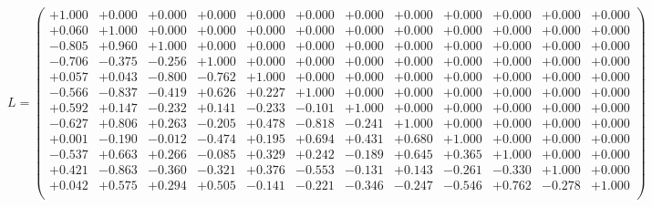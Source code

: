 \documentclass[9pt]{article}
\theoremstyle{plain}
\theoremstyle{definition}
\theoremstyle{remark}
\numberwithin{equation}{section}
\begin{document}
$L = \left(
\begin{array}{
cccccccccccc}
+1.000 & +0.000 & +0.000 & +0.000 & +0.000 & +0.000 & +0.000 & +0.000 & +0.000 & +0.000 & +0.000 & +0.000 \\
+0.060 & +1.000 & +0.000 & +0.000 & +0.000 & +0.000 & +0.000 & +0.000 & +0.000 & +0.000 & +0.000 & +0.000 \\
-0.805 & +0.960 & +1.000 & +0.000 & +0.000 & +0.000 & +0.000 & +0.000 & +0.000 & +0.000 & +0.000 & +0.000 \\
-0.706 & -0.375 & -0.256 & +1.000 & +0.000 & +0.000 & +0.000 & +0.000 & +0.000 & +0.000 & +0.000 & +0.000 \\
+0.057 & +0.043 & -0.800 & -0.762 & +1.000 & +0.000 & +0.000 & +0.000 & +0.000 & +0.000 & +0.000 & +0.000 \\
-0.566 & -0.837 & -0.419 & +0.626 & +0.227 & +1.000 & +0.000 & +0.000 & +0.000 & +0.000 & +0.000 & +0.000 \\
+0.592 & +0.147 & -0.232 & +0.141 & -0.233 & -0.101 & +1.000 & +0.000 & +0.000 & +0.000 & +0.000 & +0.000 \\
-0.627 & +0.806 & +0.263 & -0.205 & +0.478 & -0.818 & -0.241 & +1.000 & +0.000 & +0.000 & +0.000 & +0.000 \\
+0.001 & -0.190 & -0.012 & -0.474 & +0.195 & +0.694 & +0.431 & +0.680 & +1.000 & +0.000 & +0.000 & +0.000 \\
-0.537 & +0.663 & +0.266 & -0.085 & +0.329 & +0.242 & -0.189 & +0.645 & +0.365 & +1.000 & +0.000 & +0.000 \\
+0.421 & -0.863 & -0.360 & -0.321 & +0.376 & -0.553 & -0.131 & +0.143 & -0.261 & -0.330 & +1.000 & +0.000 \\
+0.042 & +0.575 & +0.294 & +0.505 & -0.141 & -0.221 & -0.346 & -0.247 & -0.546 & +0.762 & -0.278 & +1.000 \\
\end{array}
\right)$ \newline 
\end{document}
